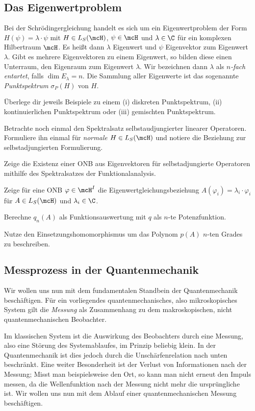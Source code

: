 \documentclass{subfiles}
\begin{document}
    \subsection{Das Eigenwertproblem}
        Bei der Schrödingergleichung handelt es sich um ein Eigenwertproblem der Form $H(\psi) = \lambda\cdot\psi$ mit $H\in L_S(\mcH)$, $\psi\in\mcH$ und $\lambda\in\C$ für ein komplexen Hilbertraum $\mcH$. Es heißt dann $\lambda$ Eigenwert und $\psi$ Eigenvektor zum Eigenwert $\lambda$. Gibt es mehrere Eigenvektoren zu einem Eigenwert, so bilden diese einen Unterraum, den Eigenraum zum Eigenwert $\lambda$. Wir bezeichnen dann $\lambda$ als \emph{$n$-fach entartet}, falls $\dim E_\lambda = n$. Die Sammlung aller Eigenwerte ist das sogenannte \emph{Punktspektrum} $\sigma_P(H)$ von $H$.
        \begin{Aufgabe}
            \nr{} Überlege dir jeweils Beispiele zu einem (i) diskreten Punktspektrum, (ii) kontinuierlichen Punktspektrum oder (iii) gemischten Punktspektrum. 

            \nr{} Betrachte noch einmal den Spektralsatz selbstaudjungierter linearer Operatoren. Formuliere ihn einmal für \emph{normale} $H\in L_S(\mcH)$ und notiere die Beziehung zur selbstadjungierten Formulierung. 

            \nr{} Zeige die Existenz einer ONB aus Eigenvektoren für selbstadjungierte Operatoren mithilfe des Spektralsatzes der Funktionalanalysis. 

            \nr{} Zeige für eine ONB $\varphi\in\mcH^I$ die Eigenwertgleichungsbeziehung $A(\varphi_i) = \lambda_i\cdot \varphi_i$ für $A\in L_S(\mcH)$ und $\lambda_i\in\C$.

            \nr{} Berechne $q_n(A)$ als Funktionsauswertung mit $q$ als $n$-te Potenzfunktion. 

            \nr{} Nutze den Einsetzungshomomorphismus um das Polynom $p(A)$ $n$-ten Grades zu beschreiben.
        \end{Aufgabe}

    \subsection{Messprozess in der Quantenmechanik}
        Wir wollen uns nun mit dem fundamentalen Standbein der Quantenmechanik beschäftigen. Für ein vorliegendes quantenmechanisches, also mikroskopisches System gilt die \emph{Messung} als Zusammenhang zu dem makroskopischen, nicht quantenmechanischen Beobachter. 
        
        Im klassischen System ist die Auswirkung des Beobachters durch eine Messung, also eine Störung des Systemablaufes, im Prinzip beliebig klein. In der Quantenmechanik ist dies jedoch durch die Unschärfenrelation nach unten beschränkt. Eine weiter Besonderheit ist der Verlust von Informationen nach der Messung; Misst man beispielsweise den Ort, so kann man nicht erneut den Impuls messen, da die Wellenfunktion nach der Messung nicht mehr die ursprüngliche ist. Wir wollen uns nun mit dem Ablauf einer quantenmechanischen Messung beschäftigen. 
        
\end{document}
